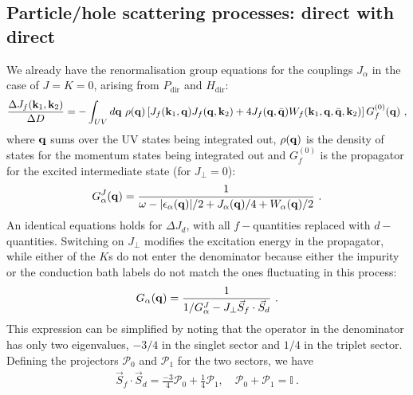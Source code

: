 \documentclass[%
reprint,
superscriptaddress,
groupedaddress,
superscriptaddress,
onecolumn,
10pt
]{revtex4-2}
\begin{document}
\subsection{Particle/hole scattering processes: direct with direct}
We already have the renormalisation group equations for the couplings \(J_\alpha\) in the case of \(J=K=0\), arising from \(P_\text{dir}\) and \(H_\text{dir}\):
\begin{equation}\begin{aligned}
	\frac{\Delta J_f({\bf k}_1, {\bf k}_2)}{\Delta D} = -\int_{UV} d{\bf q} ~\rho({\bf q}) \left[J_f({\bf k}_1, {\bf q})J_f({\bf q}, {\bf k}_2) + 4J_f({\bf q}, \bar {\bf q})W_f({\bf k}_1, {\bf q}, \bar {\bf q}, {\bf k}_2)\right] G_f^{(0)}({\bf q})~,
\end{aligned}\end{equation}
where \({\bf q}\) sums over the UV states being integrated out, \(\rho({\bf q})\) is the density of states for the momentum states being integrated out and \(G_f^{(0)}\) is the propagator for the excited intermediate state (for \(J_\perp=0\)):
\begin{equation}\begin{aligned}
	G_\alpha^J({\bf q}) = \frac{1}{\omega - |\epsilon_\alpha({\bf q})| / 2 + J_\alpha({\bf q}) / 4 + W_\alpha({\bf q}) / 2}~.
\end{aligned}\end{equation}
An identical equations holds for \(\Delta J_d\), with all \(f-\)quantities replaced with \(d-\)quantities. Switching on \(J_\perp\) modifies the excitation energy in the propagator, while either of the \(K\)s do not enter the denominator because either the impurity or the conduction bath labels do not match the ones fluctuating in this process:
\begin{equation}\begin{aligned}
	G_\alpha({\bf q}) = \frac{1}{1/G_\alpha^J - J_\perp \vec{S}_f\cdot\vec{S}_d}~.
\end{aligned}\end{equation}
This expression can be simplified by noting that the operator in the denominator has only two eigenvalues, \(-3/4\) in the singlet sector and \(1/4\) in the triplet sector. Defining the projectors \(\mathcal{P}_0\) and \(\mathcal{P}_1\) for the two sectors, we have
\begin{equation}\begin{aligned}
	\vec{S}_f\cdot\vec{S}_d = \frac{-3}{4}\mathcal{P}_0 + \frac{1}{4}\mathcal{P}_1, \quad \mathcal{P}_0 + \mathcal{P}_1 = \mathbb{I}~.
\end{aligned}\end{equation}
\end{document}
